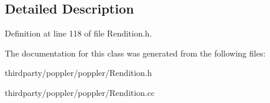 \subsection{Detailed Description}


Definition at line 118 of file Rendition.\+h.



The documentation for this class was generated from the following files\+:\begin{DoxyCompactItemize}
\item 
thirdparty/poppler/poppler/Rendition.\+h\item 
thirdparty/poppler/poppler/Rendition.\+cc\end{DoxyCompactItemize}
